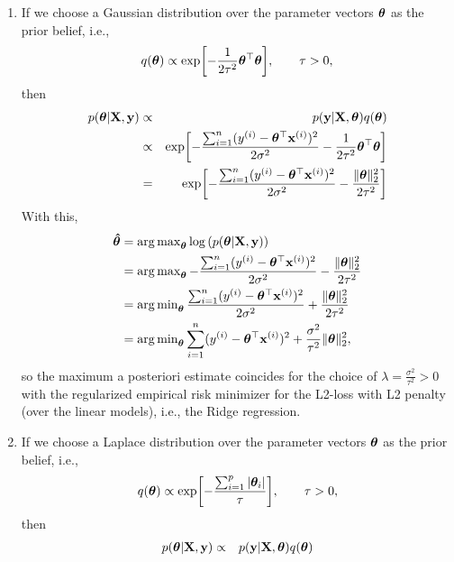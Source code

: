 \documentclass[a4paper]{article}
\begin{document}
{\begin{enumerate}
\begin{align*}
%		
		&= \argmin_{\thetab}  \frac{ \sum_{i=1}^n (\yi - \thetab^\top \xi)^2}{2\sigma^2} \\
%		
		&= \argmin_{\thetab}  \sum_{i=1}^n (\yi - \thetab^\top \xi)^2, \tag{$2\sigma^2$ is just a constant scaling}
%		
	\end{align*}
%
	so the  maximum a posteriori estimate coincides with the empirical risk minimizer for the L2-loss (over the linear models).
%
  \item If we choose a Gaussian distribution over the parameter vectors $\bm{\theta}$ as the prior belief, i.e.,
  $$  q(\bm{\theta})  \propto  \exp\biggl[ -\frac{1}{2\tau^2}\bm{\theta}^\top\bm{\theta}  \biggr], \qquad \tau>0, $$
  	then 
%  
  \begin{eqnarray*}
%  	
  	p(\thetab | \Xmat, \yv) &\propto& p(\yv | \Xmat, \thetab) q(\thetab) \\
  	&\propto& \exp\biggl[-\frac{ \sum_{i=1}^n (\yi - \thetab^\top \xi)^2}{2\sigma^2} -\frac{1}{2\tau^2}\thetab^\top\thetab \biggr] \\
%  	
	&=& \exp\biggl[-\frac{ \sum_{i=1}^n (\yi - \thetab^\top \xi)^2}{2\sigma^2} -\frac{\|\thetab\|_2^2}{2\tau^2}  \biggr]
  \end{eqnarray*}
  With this, 
  \begin{align*}
  	\thetabh 
  	&= \argmax_{\thetab} \log \left( p(\thetab | \Xmat, \yv) \right) \\
  	&= \argmax_{\thetab} -\frac{ \sum_{i=1}^n (\yi - \thetab^\top \xi)^2}{2\sigma^2} -\frac{\|\thetab\|_2^2}{2\tau^2}   \\
  	&= \argmin_{\thetab}  \frac{ \sum_{i=1}^n (\yi - \thetab^\top \xi)^2}{2\sigma^2} + \frac{\|\thetab\|_2^2}{2\tau^2}   \\
%  	
  	&= \argmin_{\thetab}   \sum_{i=1}^n (\yi - \thetab^\top \xi)^2  + \frac{\sigma^2}{ \tau^2}  \|\thetab\|_2^2   ,
  \end{align*}
  so the  maximum a posteriori estimate coincides for the choice of $\lambda = \frac{\sigma^2}{ \tau^2}>0$ with the regularized empirical risk minimizer for the L2-loss with L2 penalty (over the linear models), i.e., the Ridge regression.
%  
  \item If we choose a Laplace distribution over the parameter vectors $\bm{\theta}$ as the prior belief, i.e.,
%  
	$$  q(\bm{\theta})  \propto  \exp\biggl[-\frac{\sum_{i=1}^p |\bm{\theta}_i|}{\tau} \biggr], \qquad \tau>0, $$
	  	then 
%	
	\begin{eqnarray*}
		p(\thetab | \Xmat, \yv) &\propto& p(\yv | \Xmat, \thetab) q(\thetab) \\

\end{eqnarray*}
\end{enumerate}}
\end{document}
